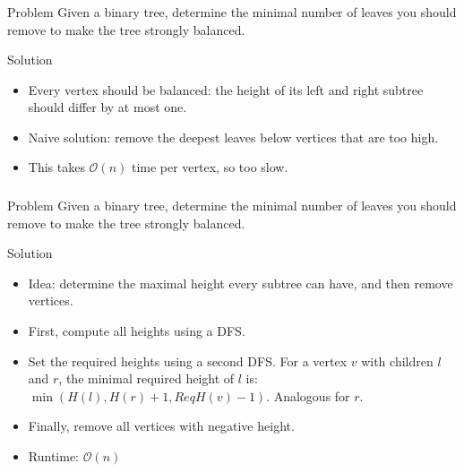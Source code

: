 \begin{frame}
    \frametitle{\problemtitle}
    \begin{block}{Problem}
        Given a binary tree, determine the minimal number of leaves you should remove to make the tree strongly balanced.
    \end{block}
    \pause
    \begin{block}{Solution}
        \begin{itemize}
            \item<+-> Every vertex should be balanced: the height of its left and right subtree should differ by at most one.
            \item<+-> Naive solution: remove the deepest leaves below vertices that are too high.
            \item<+-> This takes $\mathcal{O}(n)$ time per vertex, so too slow.
        \end{itemize}
    \end{block}
\end{frame}
\begin{frame}
    \frametitle{\problemtitle}
    \begin{block}{Problem}
        Given a binary tree, determine the minimal number of leaves you should remove to make the tree strongly balanced.
    \end{block}
    \begin{block}{Solution}
        \begin{itemize}
            \item<+-> Idea: determine the maximal height every subtree can have,
                and then remove vertices.
            \item<+-> First, compute all heights using a DFS.
            \item<+-> Set the required heights using a second DFS. For a vertex $v$ with children $l$ and $r$, the minimal required height of $l$ is: $\min(H(l),H(r)+1,ReqH(v)-1)$. Analogous for $r$.
            \item<+-> Finally, remove all vertices with negative height.
            \item<+-> Runtime: $\mathcal{O}(n)$
        \end{itemize}
    \end{block}
    \solvestats
\end{frame}
